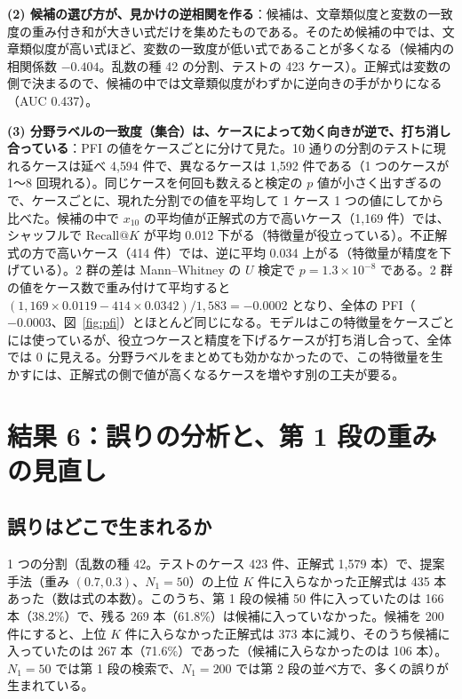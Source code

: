\documentclass[a4j,dvipdfmx,11pt]{jresume}
\makeatletter
\newcommand{\rk}{\textrm{Recall@}K}
\makeatother
\begin{document}
\textbf{(2) 候補の選び方が、見かけの逆相関を作る}：候補は、文章類似度と変数の一致度の重み付き和が大きい式だけを集めたものである。そのため候補の中では、文章類似度が高い式ほど、変数の一致度が低い式であることが多くなる（候補内の相関係数 $-0.404$。乱数の種 42 の分割、テストの 423 ケース）。正解式は変数の側で決まるので、候補の中では文章類似度がわずかに逆向きの手がかりになる（AUC 0.437）。

\textbf{(3) 分野ラベルの一致度（集合）は、ケースによって効く向きが逆で、打ち消し合っている}：PFI の値をケースごとに分けて見た。10 通りの分割のテストに現れるケースは延べ 4{,}594 件で、異なるケースは 1{,}592 件である（1 つのケースが 1〜8 回現れる）。同じケースを何回も数えると検定の $p$ 値が小さく出すぎるので、ケースごとに、現れた分割での値を平均して 1 ケース 1 つの値にしてから比べた。候補の中で $x_{10}$ の平均値が正解式の方で高いケース（1{,}169 件）では、シャッフルで $\rk$ が平均 0.012 下がる（特徴量が役立っている）。不正解式の方で高いケース（414 件）では、逆に平均 0.034 上がる（特徴量が精度を下げている）。2 群の差は Mann--Whitney の $U$ 検定で $p = 1.3 \times 10^{-8}$ である。2 群の値をケース数で重み付けて平均すると $(1{,}169 \times 0.0119 - 414 \times 0.0342)/1{,}583 = -0.0002$ となり、全体の PFI（$-0.0003$、図~\ref{fig:pfi}）とほとんど同じになる。モデルはこの特徴量をケースごとには使っているが、役立つケースと精度を下げるケースが打ち消し合って、全体では 0 に見える。分野ラベルをまとめても効かなかったので、この特徴量を生かすには、正解式の側で値が高くなるケースを増やす別の工夫が要る。

\section{結果 6：誤りの分析と、第 1 段の重みの見直し}\label{sec:error}
\subsection{誤りはどこで生まれるか}\label{sec:errwhere}
1 つの分割（乱数の種 42。テストのケース 423 件、正解式 1{,}579 本）で、提案手法（重み $(0.7, 0.3)$、$N_1 = 50$）の上位 $K$ 件に入らなかった正解式は 435 本あった（数は式の本数）。このうち、第 1 段の候補 50 件に入っていたのは 166 本（38.2\%）で、残る 269 本（61.8\%）は候補に入っていなかった。候補を 200 件にすると、上位 $K$ 件に入らなかった正解式は 373 本に減り、そのうち候補に入っていたのは 267 本（71.6\%）であった（候補に入らなかったのは 106 本）。$N_1 = 50$ では第 1 段の検索で、$N_1 = 200$ では第 2 段の並べ方で、多くの誤りが生まれている。
\end{document}
